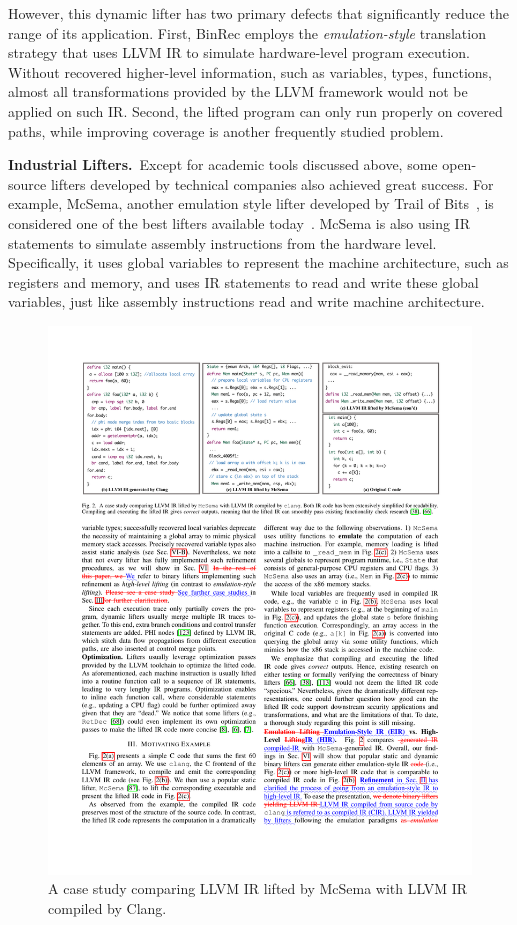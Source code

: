 However, this dynamic lifter has two primary defects that significantly reduce 
the range of its application. First, BinRec employs the 
\textit{emulation-style} translation strategy that uses LLVM IR to simulate 
hardware-level program execution. Without recovered higher-level information, 
such as variables, types, functions, almost all transformations provided by the 
LLVM framework would not be applied on such IR. Second, the lifted program can 
only run properly on covered paths, while improving coverage is another 
frequently studied problem.

\noindent\textbf{Industrial Lifters.}~Except for academic tools discussed 
above, some open-source lifters developed by technical companies also achieved 
great success. For example, McSema, another emulation style lifter developed by 
Trail of Bits~\cite{trailofbits}, is considered one of the best lifters 
available today~\cite{mcsema}.
McSema is also using IR statements to simulate assembly instructions from the 
hardware level. Specifically, it uses global variables to represent the machine 
architecture, such as registers and memory, and uses IR statements to read and 
write these global variables, just like assembly instructions read and write 
machine architecture.

\begin{figure}[tb]
  \centering
  \includegraphics[width=1.0\textwidth]{fig/mcsema.pdf}
  \caption{A case study comparing LLVM IR lifted by McSema with LLVM IR compiled by Clang.}
  \label{fig:mcsema}
\end{figure}

